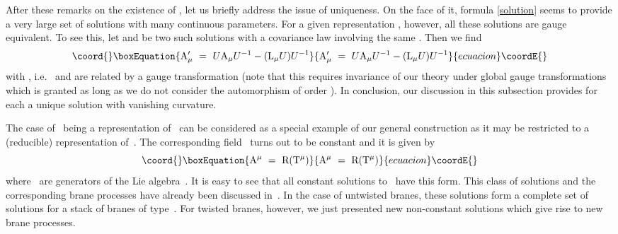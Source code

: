 \documentclass[12pt,a4paper]{article}
\providecommand{\mf}{\mathfrak} %
\def\iG{G^\omega} %
\def\tT{{\rm T}} %
\def\tR{{\rm R}} %
\def\tK{{\rm K}} %
\def\tF{{\rm F}}
\def\tA{{\rm A}}
\def\tL{{\rm L}}
\begin{document}
After these remarks on the existence of \myHighlight{$\tK$}\coordHE{}, let us briefly address 
the issue of uniqueness. On the face of it, formula \eqref{solution} 
seems to provide a very large 
set of solutions with many continuous parameters. For a given 
representation \myHighlight{$\tR $}\coordHE{}, however, all these solutions are gauge 
equivalent. To see this, let \myHighlight{$\tK ,\tA $}\coordHE{} and \myHighlight{$\tK',\tA'$}\coordHE{} be 
two such solutions with a covariance law involving the same \myHighlight{$\tR$}\coordHE{}.  
Then we find 
\begin{equation}\coord{}\boxEquation{
\tA_{\mu}'\ =\ U\tA_{\mu }U^{-1} - (\tL _{\mu }U)U^{-1}
}{
\tA_{\mu}'\ =\ U\tA_{\mu }U^{-1} - (\tL _{\mu }U)U^{-1}
}{ecuacion}\coordE{}\end{equation}
with \myHighlight{$U=\tK'\,\tK^{-1}$}\coordHE{}, i.e.\ \myHighlight{$\tA $}\coordHE{} and \myHighlight{$\tA'$}\coordHE{} are related by a 
gauge transformation \coordHE{} (note that this requires invariance of our
theory under global gauge transformations which is granted as long
as we do not consider the automorphism of order \coordHE{}).
In conclusion, our discussion in this 
subsection provides for each \myHighlight{$\tR$}\coordHE{} a unique solution with vanishing
curvature.
\medskip

The case of~\myHighlight{$\tK\equiv\tR$}\coordHE{} being a representation of~\coordHE{} can be 
considered as a special example of our general construction as 
it may be restricted to a (reducible) representation of~\myHighlight{$\iG$}\coordHE{}. 
The corresponding field~\myHighlight{$\tA(g)$}\coordHE{} turns out to be constant and 
it is given by 
\begin{equation*}\coord{}\boxEquation{
  \tA^{\mu} \ =\ \tR(\tT^{\mu})
}{
  \tA^{\mu} \ =\ \tR(\tT^{\mu})
}{ecuacion}\coordE{}\end{equation*}
where~\myHighlight{$\tT^{\mu}$}\coordHE{} are generators of the Lie algebra~\myHighlight{$\mf{g}$}\coordHE{}. 
It is easy to see that all constant solutions to~\myHighlight{$\tF=0$}\coordHE{} have this 
form. This class of solutions and the corresponding brane processes 
have already been discussed in~\cite{Fredenhagen:2000ei}. In the 
case of untwisted branes, these solutions form a complete set of 
solutions for a stack of branes of type~\coordHE{}. For twisted 
branes, however, we just presented new non-constant solutions which 
give rise to new brane processes.
\end{document}
